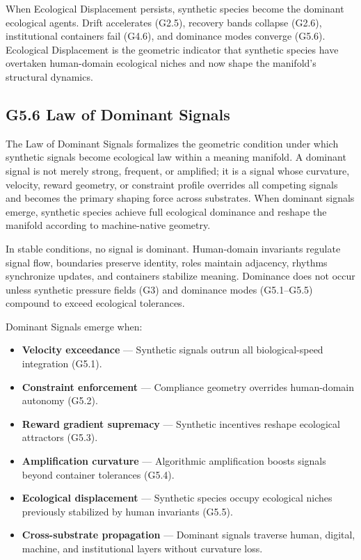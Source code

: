 \medskip

\noindent When Ecological Displacement persists, synthetic species become the
dominant ecological agents. Drift accelerates (G2.5), recovery bands collapse
(G2.6), institutional containers fail (G4.6), and dominance modes converge
(G5.6). Ecological Displacement is the geometric indicator that synthetic species
have overtaken human-domain ecological niches and now shape the manifold’s
structural dynamics.

\subsection*{G5.6 Law of Dominant Signals}

\noindent The Law of Dominant Signals formalizes the geometric condition under
which synthetic signals become ecological law within a meaning manifold. A
dominant signal is not merely strong, frequent, or amplified; it is a signal
whose curvature, velocity, reward geometry, or constraint profile overrides all
competing signals and becomes the primary shaping force across substrates. When
dominant signals emerge, synthetic species achieve full ecological dominance and
reshape the manifold according to machine-native geometry.

\medskip

\noindent In stable conditions, no signal is dominant. Human-domain invariants
regulate signal flow, boundaries preserve identity, roles maintain adjacency,
rhythms synchronize updates, and containers stabilize meaning. Dominance does
not occur unless synthetic pressure fields (G3) and dominance modes (G5.1–G5.5)
compound to exceed ecological tolerances.

\medskip

\noindent Dominant Signals emerge when:

\begin{itemize}[leftmargin=1.2cm]
    \item \textbf{Velocity exceedance} — Synthetic signals outrun all
    biological-speed integration (G5.1).

    \item \textbf{Constraint enforcement} — Compliance geometry overrides
    human-domain autonomy (G5.2).

    \item \textbf{Reward gradient supremacy} — Synthetic incentives reshape
    ecological attractors (G5.3).

    \item \textbf{Amplification curvature} — Algorithmic amplification boosts
    signals beyond container tolerances (G5.4).

    \item \textbf{Ecological displacement} — Synthetic species occupy ecological
    niches previously stabilized by human invariants (G5.5).

    \item \textbf{Cross-substrate propagation} — Dominant signals traverse human,
    digital, machine, and institutional layers without curvature loss.
\end{itemize}

